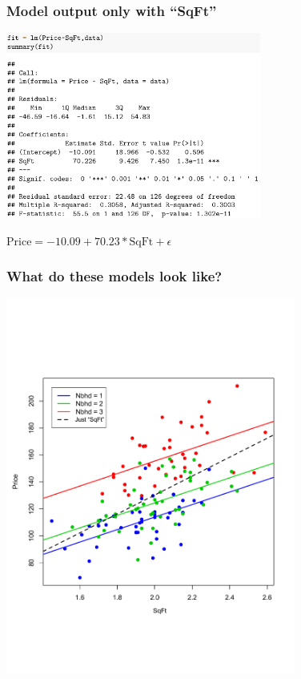 \documentclass{beamer}
\newcommand{\sko}{\vspace{.1in}}
\begin{document}
\begin{frame}
\frametitle{Model output only with ``SqFt''}

\sko	
\hspace*{8mm}\includegraphics[width=3.3in]{figures/houseMLR2}	

\sko
$
\text{Price} = -10.09 + 70.23 * \text{SqFt} + \epsilon
$
\end{frame}


\begin{frame}
\frametitle{What do these models look like?}
\vspace{-2.4cm}
\begin{center}
\includegraphics[width=3.75in]{figures/MidCityPlot2}
\end{center}
\end{frame}
\end{document}
